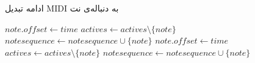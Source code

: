\setcounter{algorithm}{0}
\begin{algorithm}
\caption{ادامه تبدیل \gls{MIDI} به دنباله‌ی نت}
\begin{algorithmic}
\begin{latin}
                    \State $note.offset \leftarrow time$
                    \State $actives \leftarrow actives \setminus \{note\}$
                    \State $notesequence \leftarrow notesequence \cup \{note\}$
                \EndIf
            \EndFor
        \EndIf
    \EndFor
        \State $note.offset \leftarrow time$
        \State $actives \leftarrow actives \setminus \{note\}$
        \State $notesequence \leftarrow notesequence \cup \{note\}$
    \EndFor
\end{latin}
\end{algorithmic}
\end{algorithm}
